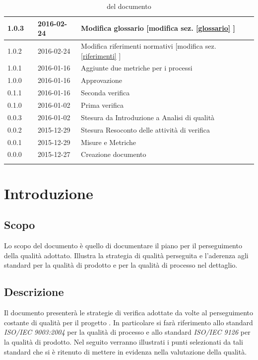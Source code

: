 \documentclass[12pt,a4paper]{article}
\begin{document}
\begin{center}
\begin{longtable}[H]{p{} p{} p{} p{}}
		\midrule
		1.0.3 & \AB{} & 2016-02-24 & Modifica glossario [modifica sez. \ref{glossario} ] \\*
		\midrule
		1.0.2 & \AB{} & 2016-02-24 & Modifica riferimenti normativi [modifica sez. \ref{riferimenti} ] \\*
		\midrule
		1.0.1 & \AVI{} & 2016-01-16 & Aggiunte due metriche per i processi \\*
		\midrule
		1.0.0 & \IB{} & 2016-01-16 & Approvazione \\*
		\midrule
		0.1.1 & \AVE{} & 2016-01-16 & Seconda verifica \\*
		\midrule
		0.1.0 & \NDC{} & 2016-01-02 & Prima verifica \\*
		\midrule
		0.0.3 & \AB{} & 2016-01-02 &  Stesura da Introduzione a Analisi di qualità\\*
		\midrule
		0.0.2 & \WS{} & 2015-12-29 &  Stesura Resoconto delle attività di verifica\\*
		\midrule
		0.0.1 & \AVI{} & 2015-12-29 &  Misure e Metriche \\*
		\midrule
		0.0.0 & \IB{} & 2015-12-27 &  Creazione documento \\*
		\bottomrule
		\caption{\mgls{versionamento}  del documento}
		\label{tabVers1}
	\end{longtable}
\end{center}

\newpage
\tableofcontents
\newpage
\listoftables
\listoffigures
\newpage


\section{Introduzione}	\label{intro}
\subsection{Scopo}
Lo scopo del documento è quello di documentare il piano per il perseguimento della qualità adottato. Illustra la strategia di qualità perseguita e l'aderenza agli standard per la qualità di prodotto e per la qualità di processo nel dettaglio. 

\subsection{Descrizione}
Il documento presenterà  le strategie di verifica adottate da \nomeGruppo{} volte al perseguimento costante di  qualità per il progetto \prjL{}. In particolare si farà riferimento allo standard \textit{ISO/IEC 9003:2004} per la qualità di processo e allo standard \textit{ISO/IEC 9126} per la qualità di prodotto. Nel seguito verranno illustrati i punti selezionati da tali standard che si è ritenuto di mettere in evidenza nella valutazione della qualità.
\end{document}
